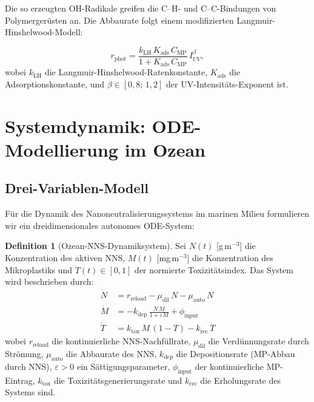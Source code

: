 ﻿\documentclass[12pt,a4paper]{article}
\theoremstyle{definition}
\newtheorem{definition}{Definition}[section]
\theoremstyle{remark}
\begin{document}
Die so erzeugten OH-Radikale greifen die C--H- und C--C-Bindungen von
Polymergerüsten an. Die Abbaurate folgt einem modifizierten Langmuir-Hinshelwood-Modell:

\begin{equation}
  r_{\text{phot}} = \frac{k_{\text{LH}}\,K_{\text{ads}}\,C_{\text{MP}}}
                        {1 + K_{\text{ads}}\,C_{\text{MP}}}\,I_{UV}^\beta,
  \label{eq:lh_model}
\end{equation}
wobei $k_{\text{LH}}$ die Langmuir-Hinshelwood-Ratenkonstante,
$K_{\text{ads}}$ die Adsorptionskonstante, und $\beta \in [0{,}8;\,1{,}2]$
der UV-Intensitäts-Exponent ist.

\section{Systemdynamik: ODE-Modellierung im Ozean}
\label{sec:ode}

\subsection{Drei-Variablen-Modell}

Für die Dynamik des Nanoneutralisierungssystems im marinen Milieu formulieren
wir ein dreidimensionales autonomes ODE-System:

\begin{definition}[Ozean-NNS-Dynamiksystem]
\label{def:ode_system}
Sei $N(t)$ [g\,m$^{-3}$] die Konzentration des aktiven NNS,
$M(t)$ [mg\,m$^{-3}$] die Konzentration des Mikroplastiks und
$T(t) \in [0,1]$ der normierte Toxizitätsindex. Das System wird beschrieben durch:
\begin{align}
  \dot{N} &= r_{\text{reload}} - \mu_{\text{dil}}\,N - \mu_{\text{auto}}\,N
  \label{eq:ode_N}\\
  \dot{M} &= -k_{\text{dep}}\,\frac{N\,M}{1+\varepsilon M} + \phi_{\text{input}}
  \label{eq:ode_M}\\
  \dot{T} &= k_{\text{tox}}\,M\,(1-T) - k_{\text{rec}}\,T
  \label{eq:ode_T}
\end{align}
wobei $r_{\text{reload}}$ die kontinuierliche NNS-Nachfüllrate,
$\mu_{\text{dil}}$ die Verdünnungsrate durch Strömung,
$\mu_{\text{auto}}$ die Abbaurate des NNS,
$k_{\text{dep}}$ die Depositionsrate (MP-Abbau durch NNS),
$\varepsilon > 0$ ein Sättigungsparameter,
$\phi_{\text{input}}$ der kontinuierliche MP-Eintrag,
$k_{\text{tox}}$ die Toxizitätsgenerierungsrate und
$k_{\text{rec}}$ die Erholungsrate des Systems sind.
\end{definition}
\end{document}
